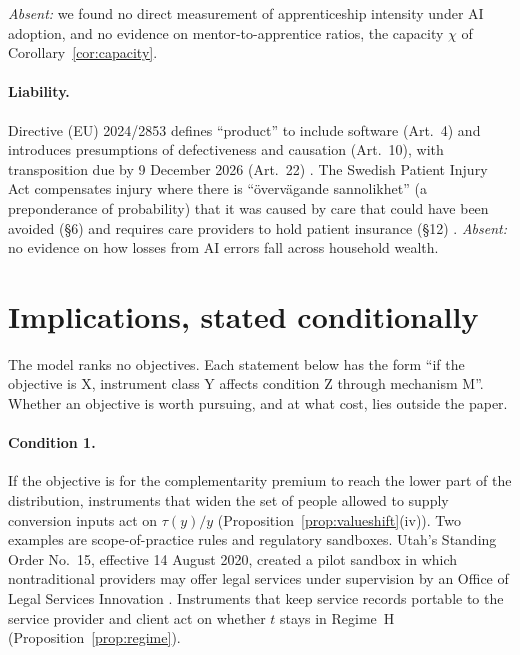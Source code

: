 \documentclass[12pt]{article}
\theoremstyle{remark}
\begin{document}
\emph{Absent:} we found no direct measurement of apprenticeship intensity under AI adoption, and no evidence on mentor-to-apprentice ratios, the capacity $\chi$ of Corollary~\ref{cor:capacity}.

\paragraph{Liability.} Directive (EU) 2024/2853 defines ``product'' to include software (Art.~4) and introduces presumptions of defectiveness and causation (Art.~10), with transposition due by 9 December 2026 (Art.~22) \citep{eu2024pld}. The Swedish Patient Injury Act compensates injury where there is ``övervägande sannolikhet'' (a preponderance of probability) that it was caused by care that could have been avoided (§6) and requires care providers to hold patient insurance (§12) \citep{sweden1996patient}. \emph{Absent:} no evidence on how losses from AI errors fall across household wealth.

\section{Implications, stated conditionally}\label{sec:implications}

The model ranks no objectives. Each statement below has the form ``if the objective is X, instrument class Y affects condition Z through mechanism M''. Whether an objective is worth pursuing, and at what cost, lies outside the paper.

\paragraph{Condition 1.} If the objective is for the complementarity premium to reach the lower part of the distribution, instruments that widen the set of people allowed to supply conversion inputs act on $\tau(y)/y$ (Proposition~\ref{prop:valueshift}(iv)). Two examples are scope-of-practice rules and regulatory sandboxes. Utah's Standing Order No.~15, effective 14 August 2020, created a pilot sandbox in which nontraditional providers may offer legal services under supervision by an Office of Legal Services Innovation \citep{utah2020so15}. Instruments that keep service records portable to the service provider and client act on whether $t$ stays in Regime~H (Proposition~\ref{prop:regime}).
\end{document}
